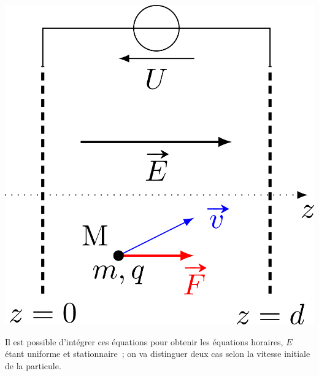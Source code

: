 \documentclass[../../main/main.tex]{subfiles}
\begin{document}
\begin{enumerate}[label=\sqenumi]
\begin{minipage}[t]{0.28\linewidth}
\begin{center}
{				\includegraphics[width=.8\linewidth]{chp_E-base}
			}
			\vspace{-15pt}
			\label{fig:chp_E_base}
		\end{center}
	\end{minipage}
\end{enumerate}
\begin{enumerate}[label=\sqenumi, resume]
	\vspace{-18pt}
	\psw{
		\[m\af = \Ff\]
	}
	\vspace{-15pt}
	 Il est possible d'intégrer ces équations pour
	obtenir les équations horaires, $E$ étant uniforme et stationnaire~; on
	va distinguer deux cas selon la vitesse initiale de la particule.
\end{enumerate}
\end{document}
